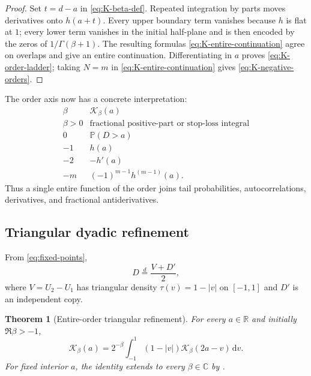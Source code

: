 \documentclass[11pt,oneside]{article}
\newtheorem{theorem}{Theorem}[section]
\theoremstyle{definition}
\theoremstyle{remark}
\newcommand{\R}{\mathbb R}
\newcommand{\C}{\mathbb C}
\newcommand{\Prob}{\mathbb P}
\newcommand{\dd}{\,\mathrm d}
\newcommand{\Kord}{\mathcal K}
\begin{document}
\begin{proof}
Set $t=d-a$ in \eqref{eq:K-beta-def}.  Repeated integration by parts moves
derivatives onto $h(a+t)$.  Every upper boundary term vanishes because $h$
is flat at $1$; every lower term vanishes in the initial half-plane and is
then encoded by the zeros of $1/\Gamma(\beta+1)$.  The resulting formulas
\eqref{eq:K-entire-continuation} agree on overlaps and give an entire
continuation.  Differentiating in $a$ proves \eqref{eq:K-order-ladder}; taking
$N=m$ in \eqref{eq:K-entire-continuation} gives
\eqref{eq:K-negative-orders}.
\end{proof}

The order axis now has a concrete interpretation:
\begin{equation}
 \begin{array}{c|c}
 \beta & \Kord_\beta(a)\\ \hline
 \beta>0 & \text{fractional positive-part or stop-loss integral}\\
 0 & \Prob(D>a)\\
 -1 & h(a)\\
 -2 & -h'(a)\\
 -m & (-1)^{m-1}h^{(m-1)}(a).
 \end{array}
 \label{eq:K-order-dictionary}
\end{equation}
Thus a single entire function of the order joins tail probabilities,
autocorrelations, derivatives, and fractional antiderivatives.

\subsection{Triangular dyadic refinement}

From \eqref{eq:fixed-points},
\begin{equation}
 D\overset d=\frac{V+D'}2,
 \label{eq:D-fixed-point}
\end{equation}
where $V=U_2-U_1$ has triangular density
$\tau(v)=1-|v|$ on $[-1,1]$ and $D'$ is an independent copy.

\begin{theorem}[Entire-order triangular refinement]
\label{thm:K-refinement}
For every $a\in\R$ and initially $\Re\beta>-1$,
\begin{equation}
 \Kord_\beta(a)
 =2^{-\beta}\int_{-1}^{1}(1-|v|)
  \Kord_\beta(2a-v)\dd v.
 \label{eq:K-refinement}
\end{equation}
For fixed interior $a$, the identity extends to every $\beta\in\C$ by
.
\end{theorem}
\end{document}
